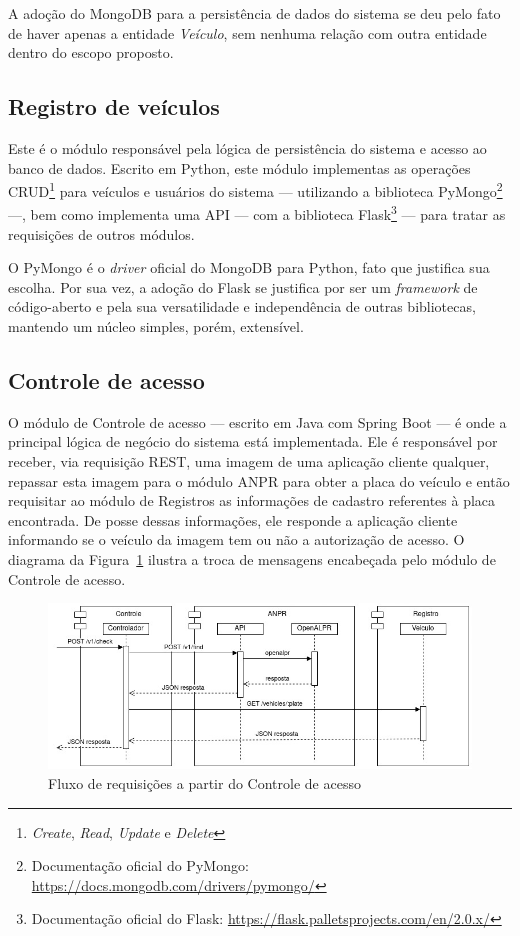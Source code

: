\documentclass[12pt]{article}
\begin{document}
A adoção do MongoDB para a persistência de dados do sistema se deu pelo fato de haver apenas a entidade \textit{Veículo}, sem nenhuma relação com outra entidade dentro do escopo proposto.

\subsection{Registro de veículos}

Este é o módulo responsável pela lógica de persistência do sistema e acesso ao banco de dados. Escrito em Python, este módulo implementas as operações CRUD\footnote{\textit{Create}, \textit{Read}, \textit{Update} e \textit{Delete}} para veículos e usuários do sistema — utilizando a biblioteca PyMongo\footnote{Documentação oficial do PyMongo: \url{https://docs.mongodb.com/drivers/pymongo/}} —, bem como implementa uma API — com a biblioteca Flask\footnote{Documentação oficial do Flask: \url{https://flask.palletsprojects.com/en/2.0.x/}} — para tratar as requisições de outros módulos.

O PyMongo é o \textit{driver} oficial do MongoDB para Python, fato que justifica sua escolha. Por sua vez, a adoção do Flask se justifica por ser um \textit{framework} de código-aberto e pela sua versatilidade e independência de outras bibliotecas, mantendo um núcleo simples, porém, extensível. 

\subsection{Controle de acesso}

O módulo de Controle de acesso — escrito em Java com Spring Boot — é onde a principal lógica de negócio do sistema está implementada. Ele é responsável por receber, via requisição REST, uma imagem de uma aplicação cliente qualquer, repassar esta imagem para o módulo ANPR para obter a placa do veículo e então requisitar ao módulo de Registros as informações de cadastro referentes à placa encontrada. De posse dessas informações, ele responde a aplicação cliente informando se o veículo da imagem tem ou não a autorização de acesso. O diagrama da Figura~\ref{fig:check4j} ilustra a troca de mensagens encabeçada pelo módulo de Controle de acesso.

\begin{figure}[ht]
	\centering
	\includegraphics[width=1\textwidth]{check4j.jpg}
	\caption{Fluxo de requisições a partir do Controle de acesso}
	\label{fig:check4j}
\end{figure}
\end{document}
